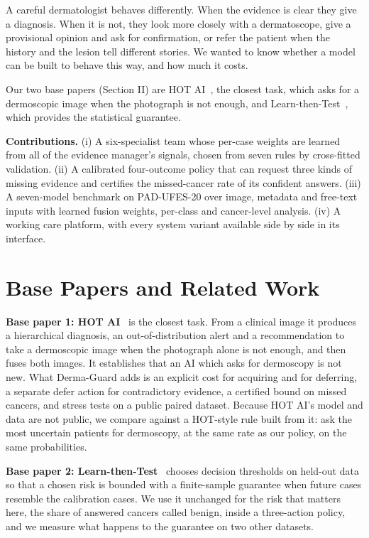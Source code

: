 \documentclass[conference]{IEEEtran}
\begin{document}
A careful dermatologist behaves differently. When the evidence is clear they give a diagnosis. When it is not, they look more closely with a dermatoscope, give a provisional opinion and ask for confirmation, or refer the patient when the history and the lesion tell different stories. We wanted to know whether a model can be built to behave this way, and how much it costs.

Our two base papers (Section II) are HOT AI~\cite{r2}, the closest task, which asks for a dermoscopic image when the photograph is not enough, and Learn-then-Test~\cite{r3}, which provides the statistical guarantee.

\textbf{Contributions.} (i) A six-specialist team whose per-case weights are learned from all of the evidence manager's signals, chosen from seven rules by cross-fitted validation. (ii) A calibrated four-outcome policy that can request three kinds of missing evidence and certifies the missed-cancer rate of its confident answers. (iii) A seven-model benchmark on PAD-UFES-20 over image, metadata and free-text inputs with learned fusion weights, per-class and cancer-level analysis. (iv) A working care platform, with every system variant available side by side in its interface.

\section{Base Papers and Related Work}
\textbf{Base paper 1: HOT AI}~\cite{r2} is the closest task. From a clinical image it produces a hierarchical diagnosis, an out-of-distribution alert and a recommendation to take a dermoscopic image when the photograph alone is not enough, and then fuses both images. It establishes that an AI which asks for dermoscopy is not new. What Derma-Guard adds is an explicit cost for acquiring and for deferring, a separate defer action for contradictory evidence, a certified bound on missed cancers, and stress tests on a public paired dataset. Because HOT AI's model and data are not public, we compare against a HOT-style rule built from it: ask the most uncertain patients for dermoscopy, at the same rate as our policy, on the same probabilities.

\textbf{Base paper 2: Learn-then-Test}~\cite{r3} chooses decision thresholds on held-out data so that a chosen risk is bounded with a finite-sample guarantee when future cases resemble the calibration cases. We use it unchanged for the risk that matters here, the share of answered cancers called benign, inside a three-action policy, and we measure what happens to the guarantee on two other datasets.
\end{document}
